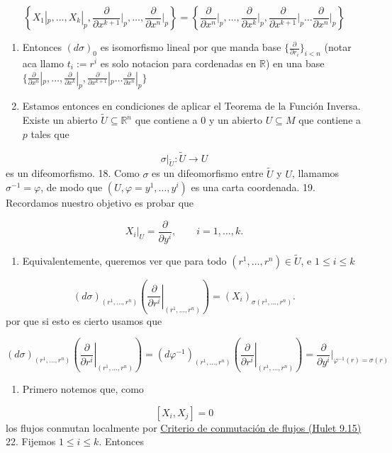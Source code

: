 \begin{bookproof}{}
\[
\left\{ X_{1}|_{p},\ldots,X_{k}|_{p},\frac{\partial}{\partial x^{k+1}}\bigg|_{p},\ldots, \frac{\partial}{\partial x^{n}}|_{p}\right\}=\left\{ \frac{\partial}{\partial x^{n}}\bigg|_{p},\ldots, \frac{\partial}{\partial x^{k}}\bigg|_{p} , \frac{\partial}{\partial x^{k+1}}|_{p}\ldots\frac{\partial}{\partial x^{n}}\bigg|_{p} \right\}
\]
\begin{enumerate}[start=16]
\item Entonces $(d\sigma)_{0}$ es isomorfismo lineal por que manda base $\{ \frac{\partial}{\partial r_{i}} \}_{i<n}$ (notar aca llamo $t_{i}:=r^{i}$ es solo notacion para cordenadas en $\mathbb{R}$) en una base $\{ \frac{\partial}{\partial x^{n}}|_{p},\ldots, \frac{\partial}{\partial x^{k}}|_{p} , \frac{\partial}{\partial x^{k+1}}|_{p}\ldots\frac{\partial}{\partial x^{n}}|_{p} \}$
\item Estamos entonces en condiciones de aplicar el Teorema de la Función Inversa. Existe un abierto $\widetilde U\subseteq\mathbb{R}^n$ que contiene a $0$ y un abierto $U\subseteq M$ que contiene a $p$ tales que
\end{enumerate}
\[
\sigma|_{\widetilde U}:\widetilde U\longrightarrow U
\]
es un difeomorfismo. 18. Como $\sigma$ es un difeomorfismo entre $\widetilde U$ y $U$, llamamos $\sigma^{-1}=\varphi$, de modo que $(U,\varphi=y^{1},\ldots,y^{i})$ es una carta coordenada. 19. Recordamos nuestro objetivo es probar que

\[
X_i|_U=\frac{\partial}{\partial y^i},\qquad i=1,\ldots,k.
\]
\begin{enumerate}[start=20]
\item Equivalentemente, queremos ver que para todo $(r^1,\ldots,r^n)\in\widetilde U$, e $1\leq i\leq k$
\end{enumerate}
\[
(d\sigma)_{(r^1,\ldots,r^n)}\left(\left.\frac{\partial}{\partial r^i}\right|_{(r^1,\ldots,r^n)}\right)=(X_i)_{\sigma(r^1,\ldots,r^n)}.
\]
por que si esto es cierto usamos que

\[
(d\sigma)_{(r^1,\ldots,r^n)}\left(\left.\frac{\partial}{\partial r^i}\right|_{(r^1,\ldots,r^n)}\right)=(d\varphi ^{-1})_{(r^1,\ldots,r^n)}\left(\left.\frac{\partial}{\partial r^i}\right|_{(r^1,\ldots,r^n)}\right)=\frac{\partial}{\partial y^{i} }\bigg|_{\varphi ^{-1}(r)=\sigma(r)}
\]
\begin{enumerate}[start=21]
\item Primero notemos que, como
\end{enumerate}
\[
[X_i,X_j]=0
\]
los flujos conmutan localmente por \hyperref[blk:26db5d]{Criterio de conmutación de flujos (Hulet 9.15)} 22. Fijemos $1\leq i\leq k$. Entonces


\end{bookproof}
